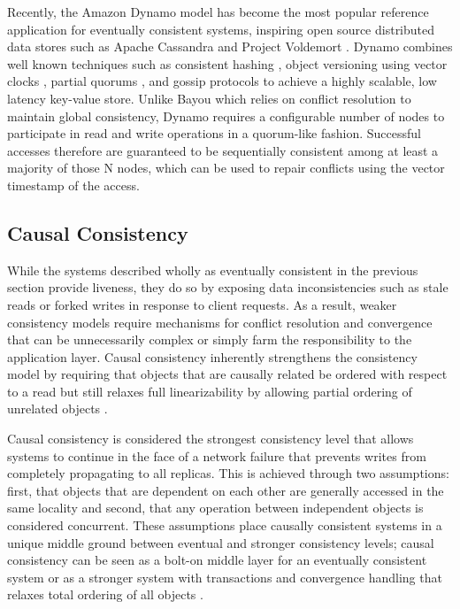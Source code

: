 \documentclass[letterpaper,twocolumn,10pt]{article}
\begin{document}
Recently, the Amazon Dynamo \cite{decandia_dynamo_2007} model has become the most popular reference application for eventually consistent systems, inspiring open source distributed data stores such as Apache Cassandra \cite{lakshman_cassandra_2010} and Project Voldemort \cite{feinberg2011project}. Dynamo combines well known techniques such as consistent hashing \cite{stoica_chord_2001}, object versioning using vector clocks \cite{lamport_time_1978}, partial quorums \cite{aiyer_availability_2005}, and gossip protocols to achieve a highly scalable, low latency key-value store. Unlike Bayou which relies on conflict resolution to maintain global consistency, Dynamo requires a configurable number of nodes to participate in read and write operations in a quorum-like fashion. Successful accesses therefore are guaranteed to be sequentially consistent among at least a majority of those N nodes, which can be used to repair conflicts using the vector timestamp of the access.

\subsection{Causal Consistency}

While the systems described wholly as eventually consistent in the previous section provide liveness, they do so by exposing data inconsistencies such as stale reads or forked writes in response to client requests. As a result, weaker consistency models require mechanisms for conflict resolution and convergence that can be unnecessarily complex or simply farm the responsibility to the application layer. Causal consistency inherently strengthens the consistency model by requiring that objects that are causally related be ordered with respect to a read but still relaxes full linearizability by allowing partial ordering of unrelated objects \cite{ahamad_causal_1990}.

Causal consistency is considered the strongest consistency level that allows systems to continue in the face of a network failure that prevents writes from completely propagating to all replicas. This is achieved through two assumptions: first, that objects that are dependent on each other are generally accessed in the same locality and second, that any operation between independent objects is considered concurrent. These assumptions place causally consistent systems in a unique middle ground between eventual and stronger consistency levels; causal consistency can be seen as a bolt-on middle layer for an eventually consistent system \cite{bailis_bolt-causal_2013} or as a stronger system with transactions and convergence handling that relaxes total ordering of all objects \cite{lloyd_dont_2011}.
\end{document}
